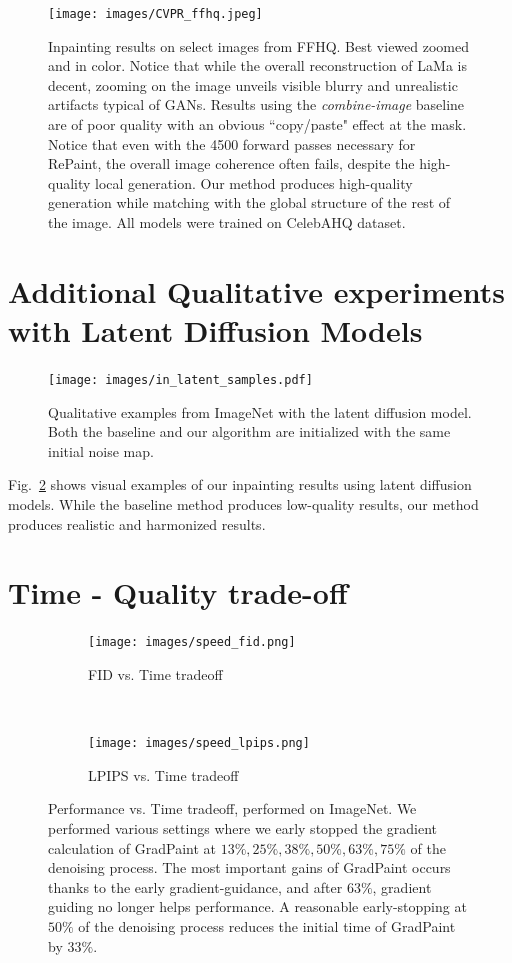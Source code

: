 \begin{figure}[htbp]
  \centering
    \texttt{[image: images/CVPR\_ffhq.jpeg]}
    \caption{Inpainting results on select images from FFHQ. Best viewed zoomed and in color. Notice that while the overall reconstruction of LaMa is decent, zooming on the image unveils visible blurry and unrealistic artifacts typical of GANs. Results using the \emph{combine-image} baseline are of poor quality with an obvious ``copy/paste" effect at the mask. Notice that even with the 4500 forward passes necessary for RePaint, the overall image coherence often fails, despite the high-quality local generation.  Our method produces high-quality generation while matching with the global structure of the rest of the image. All models were trained on CelebAHQ dataset.}
    \label{fig:res_ffhq}
\end{figure}

\section{Additional Qualitative experiments with Latent Diffusion Models}
\begin{figure}
    \centering
    \texttt{[image: images/in\_latent\_samples.pdf]}
    \caption{Qualitative examples from ImageNet with the latent diffusion model. Both the baseline and our algorithm are initialized with the same initial noise map.}
    \label{fig:qualitative_latent_imagenet}
\end{figure}

Fig.~\ref{fig:qualitative_latent_imagenet} shows visual examples of our inpainting results using latent diffusion models. While the baseline method produces low-quality results, our method produces realistic and harmonized results.  


\section{Time - Quality trade-off}

\label{speed_section}

\begin{figure}[t!]
    \centering
    \begin{subfigure}[t]{0.5\linewidth}
        \centering
        \texttt{[image: images/speed\_fid.png]}
        \caption{FID vs. Time tradeoff}
    \end{subfigure}%
    ~ 
    \begin{subfigure}[t]{0.5\linewidth}
        \centering
        \texttt{[image: images/speed\_lpips.png]}
        \caption{LPIPS vs. Time tradeoff}
    \end{subfigure}
    \caption{Performance vs. Time tradeoff, performed on ImageNet. We performed various settings where we early stopped the gradient calculation of GradPaint at $13\%, 25\%, 38\%, 50\%, 63\%, 75\%$ of the denoising process. The most important gains of GradPaint occurs thanks to the early gradient-guidance, and after $63\%$, gradient guiding no longer helps performance. A reasonable early-stopping at $50\%$ of the denoising process reduces the initial time of GradPaint by $33\%$.}
    \label{timsvsacc}
\end{figure}


